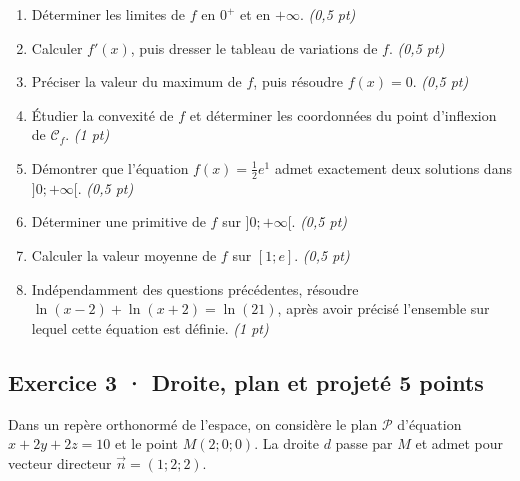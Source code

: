 \begin{enumerate}

\item Déterminer les limites de $f$ en $0^+$ et en $+\infty$. \hfill\textit{(0{,}5 pt)}

\item Calculer $f' (x)$, puis dresser le tableau de variations de $f$. \hfill\textit{(0{,}5 pt)}

\item Préciser la valeur du maximum de $f$, puis résoudre $f(x)=0$. \hfill\textit{(0{,}5 pt)}

\item Étudier la convexité de $f$ et déterminer les coordonnées du point d'inflexion de $\mathcal C_f$. \hfill\textit{(1 pt)}

\item Démontrer que l'équation $f(x)=\frac12 e^{1}$ admet exactement deux solutions dans $]0;+\infty[$. \hfill\textit{(0{,}5 pt)}

\item Déterminer une primitive de $f$ sur $]0;+\infty[$. \hfill\textit{(0{,}5 pt)}

\item Calculer la valeur moyenne de $f$ sur $[1;e]$. \hfill\textit{(0{,}5 pt)}

\item Indépendamment des questions précédentes, résoudre $\ln(x-2)+\ln(x+2)=\ln(21)$, après avoir précisé l'ensemble sur lequel cette équation est définie. \hfill\textit{(1 pt)}

\end{enumerate}

\mxnewpage{}\par

\subsection*{Exercice 3 · Droite, plan et projeté \hfill 5 points}Dans un repère orthonormé de l'espace, on considère le plan $\mathcal P$ d'équation $x+2y+2z=10$ et le point $M(2;0;0)$. La droite $d$ passe par $M$ et admet pour vecteur directeur $\vec n=(1;2;2)$.

